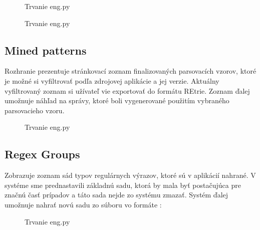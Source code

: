 \begin{figure}[htbp]
 \centering 
 \begin{minipage}{0.95\linewidth}
 	\centering
 \end{minipage}
  \caption{Trvanie eng.py }
  \label{fig:eng-duration}
\end{figure}

\begin{figure}[htbp]
 \centering 
 \begin{minipage}{0.95\linewidth}
 	\centering
 \end{minipage}
  \caption{Trvanie eng.py }
  \label{fig:eng-duration}
\end{figure}

\subsection{Mined patterns}
Rozhranie prezentuje stránkovací zoznam finalizovaných parsovacích vzorov, ktoré je možné si vyfiltrovať podľa zdrojovej aplikácie a jej verzie. Aktuálny vyfiltrovaný zoznam si užívateľ vie exportovať do formátu REtrie. Zoznam ďalej umožnuje náhľad na správy, ktoré boli vygenerované použitím vybraného parsovacieho vzoru. 

\begin{figure}[htbp]
 \centering 
 \begin{minipage}{0.95\linewidth}
 	\centering
 \end{minipage}
  \caption{Trvanie eng.py }
  \label{fig:eng-duration}
\end{figure}

\subsection{Regex Groups}
Zobrazuje zoznam sád typov regulárnych výrazov, ktoré sú v aplikácií nahrané. V systéme sme prednastavili základnú sadu, ktorá by mala byť postačujúca pre značnú časť prípadov a táto sada nejde zo systému zmazať. Systém ďalej umožnuje nahrať novú sadu zo súboru vo formáte :

 \begin{figure}[htbp]
 \centering 
 \begin{minipage}{0.95\linewidth}
 	\centering
 \end{minipage}
  \caption{Trvanie eng.py }
  \label{fig:eng-duration}
\end{figure}
